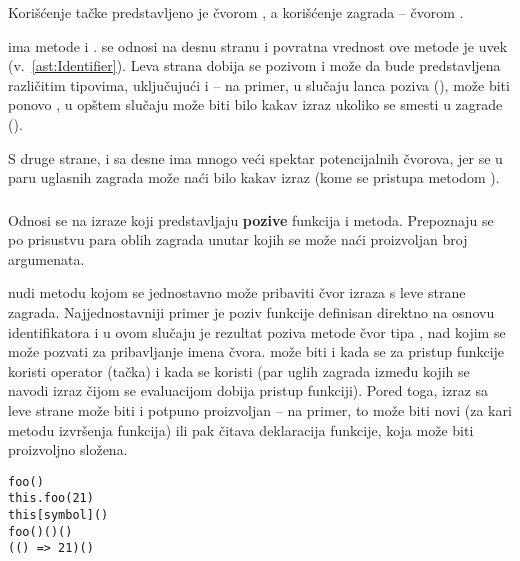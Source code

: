 Korišćenje tačke predstavljeno je čvorom , a korišćenje zagrada -- čvorom .

 ima metode  i .
 se odnosi na desnu stranu i povratna vrednost ove metode je uvek  (v.~\cref{ast:Identifier}).
Leva strana dobija se pozivom  i može da bude predstavljena različitim tipovima, uključujući i  -- na primer, u slučaju lanca poziva (), može biti ponovo , u opštem slučaju može biti bilo kakav izraz ukoliko se smesti u zagrade ().

S druge strane,  i sa desne ima mnogo veći spektar potencijalnih čvorova, jer se u paru uglasnih zagrada može naći bilo kakav izraz (kome se pristupa metodom ).

\subsubsection{}
\label{sec:sk:call-expression}

Odnosi se na izraze koji predstavljaju \textbf{pozive} funkcija i metoda.
Prepoznaju se po prisustvu para oblih zagrada unutar kojih se može naći proizvoljan broj argumenata.

 nudi metodu  kojom se jednostavno može pribaviti čvor izraza s leve strane zagrada.
Najjednostavniji primer je poziv funkcije definisan direktno na osnovu identifikatora i u ovom slučaju je rezultat poziva metode  čvor tipa , nad kojim se može pozvati  za pribavljanje imena čvora.
 može biti i  kada se za pristup funkcije koristi operator  (tačka) i  kada se koristi \code{[]} (par uglih zagrada između kojih se navodi izraz čijom se evaluacijom dobija pristup funkciji).
Pored toga, izraz sa leve strane može biti i potpuno proizvoljan  -- na primer, to može biti novi  (za kari metodu izvršenja funkcija) ili pak čitava deklaracija funkcije, koja može biti proizvoljno složena.

\begin{verbatim}
foo()
this.foo(21)
this[symbol]()
foo()()()
(() => 21)()
\end{verbatim}

